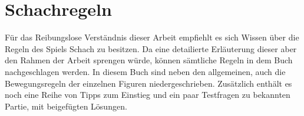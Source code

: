 \section{Schachregeln}
Für das Reibungslose Verständnis dieser Arbeit empfiehlt es sich Wissen über die Regeln des Spiels Schach zu besitzen. Da eine detailierte Erläuterung dieser aber den Rahmen der Arbeit sprengen würde, können sämtliche Regeln in dem Buch \cite{learnChess} nachgeschlagen werden. In diesem Buch sind neben den allgemeinen, auch die Bewegungsregeln der einzelnen Figuren niedergeschrieben. Zusätzlich enthält es noch eine Reihe von Tipps zum Einstieg und ein paar Testfragen zu bekannten Partie, mit beigefügten Lösungen.